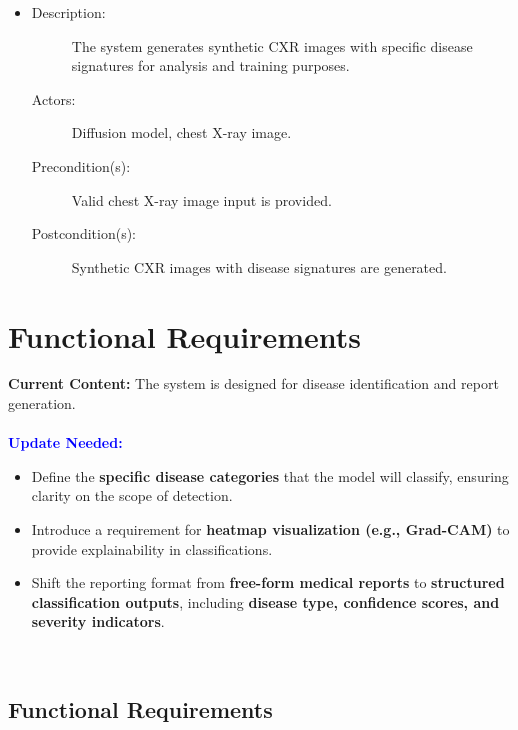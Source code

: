 \documentclass[12pt]{article}
\begin{document}
\begin{itemize}
    \item 
    \begin{description}
        \item[Description:] The system generates synthetic CXR images with specific disease signatures for analysis and training purposes.
        \item[Actors:] Diffusion model, chest X-ray image.
        \item[Precondition(s):] Valid chest X-ray image input is provided.
        \item[Postcondition(s):] Synthetic CXR images with disease signatures are generated.
    \end{description}
\end{itemize}

\section{Functional Requirements}

\textbf{Current Content:} The system is designed for disease identification and report generation. \\
\\
\textbf{\textcolor{blue}{Update Needed:}}
\begin{itemize}
    \item Define the \textbf{specific disease categories} that the model will classify, ensuring clarity on the scope of detection.
    \item Introduce a requirement for \textbf{heatmap visualization (e.g., Grad-CAM)} to provide explainability in classifications.
    \item Shift the reporting format from \textbf{free-form medical reports} to \textbf{structured classification outputs}, including \textbf{disease type, confidence scores, and severity indicators}.
\end{itemize}\\

\subsection{Functional Requirements}
\end{document}
